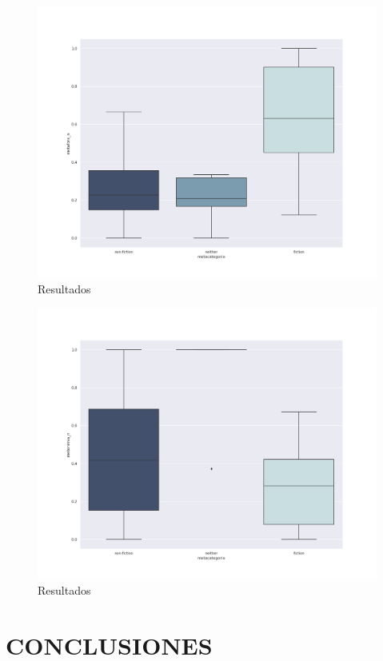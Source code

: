 \documentclass[twoside]{article}
\begin{document}
\begin{figure}[!H]
\centering
\includegraphics[width=0.9\linewidth]{./resultados/graphs/total/metafora_total.png}
\caption{\label{fig_} Resultados }
\end{figure}

\begin{figure}[!H]
\centering
\includegraphics[width=0.9\linewidth]{./resultados/graphs/total/metonimia_total.png}
\caption{\label{fig_} Resultados }
\end{figure}

\section{CONCLUSIONES}
\label{sec:org4fc8b37}




 
\end{document}
